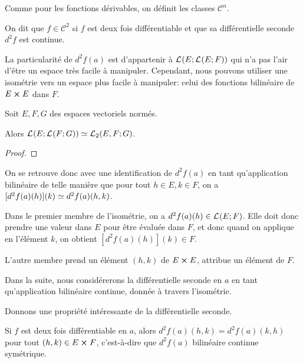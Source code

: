 Comme pour les fonctions dérivables, on définit les classes $\mathcal{C}^{n}$.

\begin{definition}
	On dit que $f \in \mathcal{C}^{2}$ si $f$ est deux fois différentiable et
	que sa différentielle seconde $d^{2}f$ est continue.
\end{definition}

La particularité de $d^{2}f(a)$ est d'appartenir à
$\GScontinueHomo{E}{\GScontinueHomo{E}{F}}$ qui n'a pas l'air d'être un espace
très facile à manipuler. Cependant, nous pouvons utiliser une isométrie vers un
espace plus facile à manipuler: celui des fonctions bilinéaire de $E \cartprod
E$ dans $F$.

\begin{proposition}
	\label{prop:identification_bilineaire}
	Soit $E, F, G$ des espaces vectoriels normés.

	Alors $\GScontinueHomo{E}{\GScontinueHomo{F}{G}} \identification
	\GScontinueHomo[2]{E,F}{G}$.
\end{proposition}

\ifdefined\outputproof
\begin{proof}

\end{proof}
\fi

On se retrouve donc avec une identification de $d^{2}f(a)$ en tant
qu'application bilinéaire de telle manière que pour tout $h \in E, k \in F$, on
a $[d^{2}f(a)(h)](k) \identification d^{2}f(a)(h, k)$.

Dans le premier membre de l'isométrie, on a $d^{2}f(a)(h) \in
\GScontinueHomo{E}{F}$. Elle doit donc prendre une valeur dans $E$ pour être
évaluée dans $F$, et donc quand on applique en l'élément $k$, on obtient
$[d^{2}f(a)(h)](k) \in F$.

L'autre membre prend un élément $(h, k)$ de $E \cartprod E$, attribue un
élément de $F$.

Dans la suite, nous considérerons la différentielle seconde en $a$ en tant
qu'application bilinéaire continue, donnée à travers l'isométrie.

Donnons une propriété intéressante de la différentielle seconde.

\begin{theorem}
	\label{theorem_schwarz}

	Si $f$ est deux fois différentiable en $a$, alors $d^{2}f(a)(h, k) =
	d^{2}f(a)(k, h)$ pour tout $(h, k) \in E \cartprod F$, c'est-à-dire que
	$d^{2}f(a)$ bilinéaire continue symétrique.
\end{theorem}

